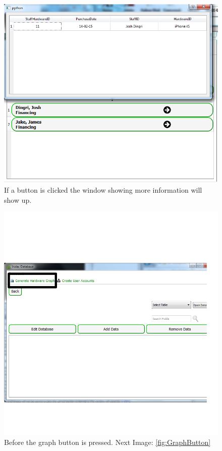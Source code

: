 \begin{figure}[H]
    \includegraphics[width=\textwidth]{./Testing/Images/SearchStaffButtons.png}
    \caption{If a button is clicked the window showing more information will show up.} \label{fig:SearchStaffButtons}
\end{figure}

\begin{figure}[H]
    \includegraphics[width=\textwidth]{./Testing/Images/OpenGraphBtn.png}
    \caption{Before the graph button is pressed. Next Image: \ref{fig:GraphButton}} \label{fig:GraphBtn}
\end{figure}

